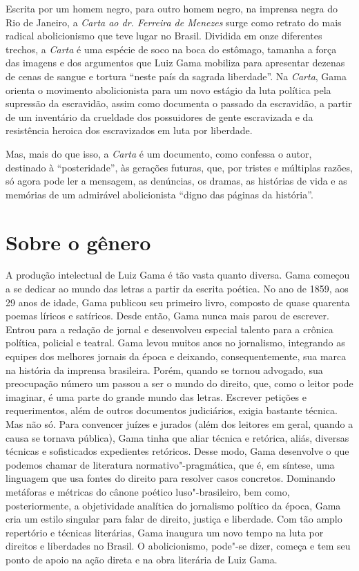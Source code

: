 Escrita por um homem negro, para outro homem negro, na imprensa negra do
Rio de Janeiro, a \emph{Carta ao dr. Ferreira de Menezes} surge como retrato do mais radical
abolicionismo que teve lugar no Brasil. Dividida em onze diferentes
trechos, a \emph{Carta} é uma espécie de soco na boca do estômago,
tamanha a força das imagens e dos argumentos que Luiz Gama mobiliza para
apresentar dezenas de cenas de sangue e tortura ``neste país da sagrada
liberdade''. Na \emph{Carta}, Gama orienta o movimento abolicionista
para um novo estágio da luta política pela supressão da escravidão,
assim como documenta o passado da escravidão, a partir de um inventário
da crueldade dos possuidores de gente escravizada e da resistência
heroica dos escravizados em luta por liberdade.

Mas, mais do que isso, a \emph{Carta} é um documento, como confessa o
autor, destinado à ``posteridade'', às gerações futuras, que, por
tristes e múltiplas razões, só agora pode ler a mensagem, as denúncias,
os dramas, as histórias de vida e as memórias de um admirável
abolicionista ``digno das páginas da história''.

\section{Sobre o gênero}

A produção intelectual de Luiz Gama é tão vasta quanto diversa. Gama
começou a se dedicar ao mundo das letras a partir da escrita poética. No
ano de 1859, aos 29 anos de idade, Gama publicou seu primeiro livro,
composto de quase quarenta poemas líricos e satíricos. Desde então, Gama
nunca mais parou de escrever. Entrou para a redação de jornal e
desenvolveu especial talento para a crônica política, policial e
teatral. Gama levou muitos anos no jornalismo, integrando as equipes dos
melhores jornais da época e deixando, consequentemente, sua marca na
história da imprensa brasileira. Porém, quando se tornou advogado, sua
preocupação número um passou a ser o mundo do direito, que, como o leitor
pode imaginar, é uma parte do grande mundo das letras. Escrever petições
e requerimentos, além de outros documentos judiciários, exigia bastante
técnica. Mas não só. Para convencer juízes e jurados (além dos leitores
em geral, quando a causa se tornava pública), Gama tinha que aliar
técnica e retórica, aliás, diversas técnicas e sofisticados expedientes
retóricos. Desse modo, Gama desenvolve o que podemos chamar de
literatura normativo"-pragmática, que é, em síntese, uma linguagem que
usa fontes do direito para resolver casos concretos. Dominando metáforas
e métricas do cânone poético luso"-brasileiro, bem como, posteriormente,
a objetividade analítica do jornalismo político da época, Gama cria um
estilo singular para falar de direito, justiça e liberdade. Com tão
amplo repertório e técnicas literárias, Gama inaugura um novo tempo na
luta por direitos e liberdades no Brasil. O abolicionismo, pode"-se
dizer, começa e tem seu ponto de apoio na ação direta e na obra
literária de Luiz Gama.

